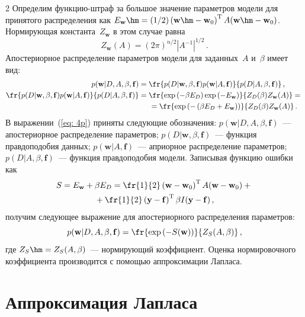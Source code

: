 \begin{multicols}{2}
Определим функцию-штраф за большое значение параметров модели для принятого 
распределения как 
$E_\mathbf{w}\hm=({1}/{2})\left(\mathbf{w} \hm- \mathbf{w}_0\right)^{\mathrm{T}}A(\mathbf{w} 
\hm- \mathbf{w}_0)$. Нормирующая константа~$Z_\mathbf{w}$ в этом случае равна
\begin{equation}
\label {eq: Zw}
Z_\mathbf{w}(A)=(2\pi)^{{n}/{2}}|A^{-1}|^{{1}/{2}}\,.
\end{equation}
Апостериорное распределение параметров модели для заданных~$A$
и~$\beta$ имеет вид:
\begin{align}
\label {eq: 4p}
p(\mathbf{w}|D,A,\beta,\mathbf{f})&=
\fr{p(D|\mathbf{w},\beta,\mathbf{f})p(\mathbf{w}|A,\mathbf{f})}{p(D|A,\beta,\mathbf{f})}\,,
\\
\fr{p(D|\mathbf{w},\beta,\mathbf{f})p(\mathbf{w}|A,\mathbf{f})}
{p(D|A,\beta,\mathbf{f})}&=\fr{\exp\left(-\beta E_D\right)
\exp\left(-E_\mathbf{w}\right)}{Z_{D}
(\beta)Z_{\mathbf{w}}(A)}={}\notag\\
&\hspace*{5mm}{}=
\fr{\exp\left(-\left(\beta E_D+E_\mathbf{w}\right)\right)}{Z_{D}(\beta)Z_{\mathbf{w}}(A)}\,.\notag
\end{align}
В выражении~(\ref{eq: 4p}) приняты следующие обозначения:
$p(\mathbf{w}|D,A,\beta,\mathbf{f})$~--- апостериорное распределение параметров;
$p(D|\mathbf{w},\beta,\mathbf{f})$~--- функция правдоподобия данных;
$p(\mathbf{w}|A,\mathbf{f})$~--- априорное распределение па\-ра\-мет\-ров;
$p(D|A,\beta,\mathbf{f})$~--- функция правдоподобия модели.
Записывая функцию ошибки как
\begin{multline}
\label {eq: S(w)}
S=E_\mathbf{w}+\beta E_D=\fr{1}{2}\left(\mathbf{w}-\mathbf{w}_0\right)^{\mathrm{T}}
A(\mathbf{w}-\mathbf{w}_0)+{}\\
{}+\fr{1}{2}\left(\mathbf{y}-\mathbf{f}\right)^{\mathrm{T}}
\beta I(\mathbf{y}-\mathbf{f})\,,
\end{multline}
получим следующее выражение для апостериорного распределения параметров: 
$$
p(\mathbf{w}|D,A,\beta,\mathbf{f})=
\fr{\exp\left(-S(\mathbf{w})\right)}{Z_S(A,\beta)}\,,
$$ 
где $Z_S\hm=Z_{S}(A,\beta)$~--- нормирующий коэффициент. Оценка нормировочного 
коэффициента производится с помощью аппроксимации Лапласа.

\section{Аппроксимация Лапласа}


\end{multicols}
